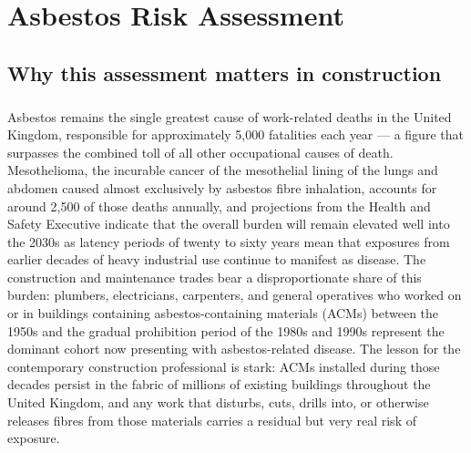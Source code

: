\chapter{Asbestos Risk Assessment}
\label{chap:Asbestos Risk Assessment}

\section{Why this assessment matters in construction}

\paragraph{}
Asbestos remains the single greatest cause of work-related deaths in the United Kingdom, responsible for approximately 5,000 fatalities each year — a figure that surpasses the combined toll of all other occupational causes of death. Mesothelioma, the incurable cancer of the mesothelial lining of the lungs and abdomen caused almost exclusively by asbestos fibre inhalation, accounts for around 2,500 of those deaths annually, and projections from the Health and Safety Executive indicate that the overall burden will remain elevated well into the 2030s as latency periods of twenty to sixty years mean that exposures from earlier decades of heavy industrial use continue to manifest as disease. The construction and maintenance trades bear a disproportionate share of this burden: plumbers, electricians, carpenters, and general operatives who worked on or in buildings containing asbestos-containing materials (ACMs) between the 1950s and the gradual prohibition period of the 1980s and 1990s represent the dominant cohort now presenting with asbestos-related disease. The lesson for the contemporary construction professional is stark: ACMs installed during those decades persist in the fabric of millions of existing buildings throughout the United Kingdom, and any work that disturbs, cuts, drills into, or otherwise releases fibres from those materials carries a residual but very real risk of exposure.

